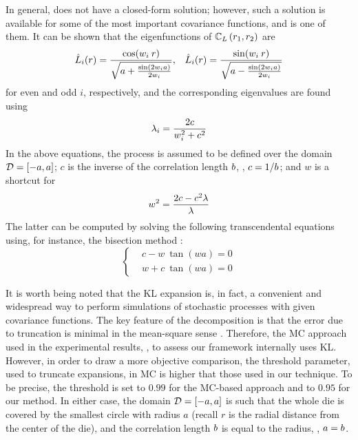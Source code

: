 In general,  does not have a closed-form solution; however, such a solution is available for some of the most important covariance functions, and  is one of them. It can be shown \cite{ghanem1991} that the eigenfunctions of $\mathbb{C}_{L}\left(r_1, r_2\right)$ are
\begin{align*}
  & \hat{L}_i(r) = \frac{\cos(w_i \: r)}{\sqrt{a + \frac{\sin(2 w_i a)}{2 w_i}}}, & \hat{L}_i(r) = \frac{\sin(w_i \: r)}{\sqrt{a - \frac{\sin(2 w_i a)}{2 w_i}}}
\end{align*}
for even and odd $i$, respectively, and the corresponding eigenvalues are found using
\[
  \lambda_i = \frac{2 c}{w_i^2 + c^2}
\]
In the above equations, the process is assumed to be defined over the domain $\mathcal{D} = [-a, a]$; $c$ is the inverse of the correlation length $b$, \ie, $c = 1 / b$; and $w$ is a shortcut for
\[
  w^2 = \frac{2 c - c^2 \lambda}{\lambda}
\]
The latter can be computed by solving the following transcendental equations using, for instance, the bisection method \cite{press2007}:
\begin{equation*}
  \begin{cases}
    & c - w \: \tan (w a) = 0 \\
    & w + c \: \tan (w a) = 0
  \end{cases}
\end{equation*}

It is worth being noted that the KL expansion is, in fact, a convenient and widespread way to perform simulations of stochastic processes with given covariance functions. The key feature of the decomposition is that the error due to truncation is minimal in the mean-square sense \cite{ghanem1991}. Therefore, the MC approach used in the experimental results, , to assess our framework internally uses KL. However, in order to draw a more objective comparison, the threshold parameter, used to truncate expansions, in MC is higher that those used in our technique. To be precise, the threshold is set to $0.99$ for the MC-based approach and to $0.95$ for our method. In either case, the domain $\mathcal{D} = [-a, a]$ is such that the whole die is covered by the smallest circle with radius $a$ (recall $r$ is the radial distance from the center of the die), and the correlation length $b$ is equal to the radius, \ie, $a = b$.
